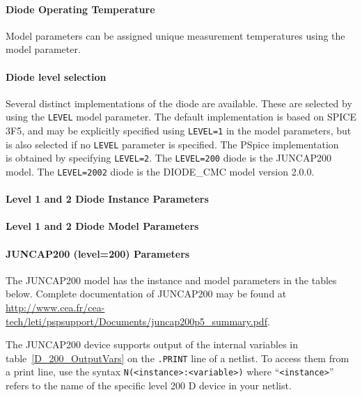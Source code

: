 \paragraph{Diode Operating Temperature}
 Model parameters can be assigned unique
measurement temperatures using the  model parameter.

\paragraph{Diode level selection}

Several distinct implementations of the diode are available.  These are
selected by using the \verb|LEVEL| model parameter.  The default
implementation is based on SPICE 3F5, and may be explicitly specified
using \verb|LEVEL=1| in the model parameters, but is also selected if no
\verb|LEVEL| parameter is specified.  The PSpice implementation
~\cite{PSpiceUG:1998} is obtained by specifying \verb|LEVEL=2|.
The \Xyce{} \verb|LEVEL=200| diode is the JUNCAP200 model.
The \Xyce{} \verb|LEVEL=2002| diode is the DIODE\_CMC model version 2.0.0.


\pagebreak

\paragraph{Level 1 and 2 Diode Instance Parameters}


\paragraph{Level 1 and 2 Diode Model Parameters}


\paragraph{JUNCAP200 (level=200) Parameters}
The JUNCAP200 model has the instance and model parameters in the
tables below.  Complete documentation of JUNCAP200 may be found at
\url{http://www.cea.fr/cea-tech/leti/pspsupport/Documents/juncap200p5_summary.pdf}.


The JUNCAP200 device supports output of the internal variables in
table~\ref{D_200_OutputVars} on the \texttt{.PRINT} line of a netlist.
To access them from a print line, use the syntax
\texttt{N(<instance>:<variable>)} where ``\texttt{<instance>}'' refers to the
name of the specific level 200 D device in your netlist.

